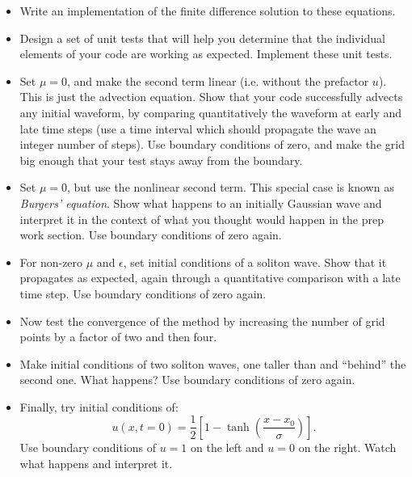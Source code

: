 \documentclass[11pt, preprint]{aastex}
\begin{document}
\begin{itemize}
\item Write an implementation of the finite difference solution to
  these equations.
\item Design a set of unit tests that will help you determine that
  the individual elements of your code are working as
  expected. Implement these unit tests.
\item Set $\mu = 0$, and make the second term linear (i.e. without the
  prefactor $u$). This is just the advection equation. Show that your
  code successfully advects any initial waveform, by comparing
  quantitatively the waveform at early and late time steps (use a time
  interval which should propagate the wave an integer number of
  steps). Use boundary conditions of zero, and make the grid big
  enough that your test stays away from the boundary.
\item Set $\mu = 0$, but use the nonlinear second term. This
  special case is known as {\it Burgers' equation}. Show what happens
  to an initially Gaussian wave and interpret it in the context of
  what you thought would happen in the prep work section. Use boundary
  conditions of zero again.
\item For non-zero $\mu$ and $\epsilon$, set initial conditions of a
  soliton wave. Show that it propagates as expected, again through a
  quantitative comparison with a late time step. Use boundary
  conditions of zero again.
\item Now test the convergence of the method by increasing the number
  of grid points by a factor of two and then four.
\item Make initial conditions of two soliton waves, one taller than
  and ``behind'' the second one. What happens? Use boundary conditions
  of zero again.
\item Finally, try initial conditions of:
  \begin{equation}
    u(x, t=0) = \frac{1}{2} \left[1 -
      \tanh\left(\frac{x-x_0}{\sigma}\right)\right].
  \end{equation}
  Use boundary conditions of $u=1$ on the left and $u=0$ on the
  right. Watch what happens and interpret it.
\end{itemize}
\end{document}
